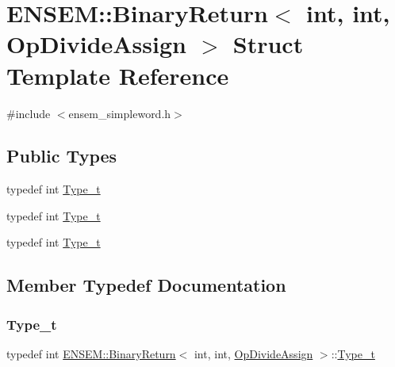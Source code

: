 \hypertarget{structENSEM_1_1BinaryReturn_3_01int_00_01int_00_01OpDivideAssign_01_4}{}\section{E\+N\+S\+EM\+:\+:Binary\+Return$<$ int, int, Op\+Divide\+Assign $>$ Struct Template Reference}
\label{structENSEM_1_1BinaryReturn_3_01int_00_01int_00_01OpDivideAssign_01_4}


{\ttfamily \#include $<$ensem\+\_\+simpleword.\+h$>$}

\subsection*{Public Types}
\begin{DoxyCompactItemize}
\item 
typedef int \mbox{\hyperlink{structENSEM_1_1BinaryReturn_3_01int_00_01int_00_01OpDivideAssign_01_4_a1d70852aadd3281d90240a0c36417d8b}{Type\+\_\+t}}
\item 
typedef int \mbox{\hyperlink{structENSEM_1_1BinaryReturn_3_01int_00_01int_00_01OpDivideAssign_01_4_a1d70852aadd3281d90240a0c36417d8b}{Type\+\_\+t}}
\item 
typedef int \mbox{\hyperlink{structENSEM_1_1BinaryReturn_3_01int_00_01int_00_01OpDivideAssign_01_4_a1d70852aadd3281d90240a0c36417d8b}{Type\+\_\+t}}
\end{DoxyCompactItemize}


\subsection{Member Typedef Documentation}
\mbox{\label{structENSEM_1_1BinaryReturn_3_01int_00_01int_00_01OpDivideAssign_01_4_a1d70852aadd3281d90240a0c36417d8b}} 
\subsubsection{\texorpdfstring{Type\_t}{Type\_t}\hspace{0.1cm}{\footnotesize\ttfamily [1/3]}}
{\footnotesize\ttfamily typedef int \mbox{\hyperlink{structENSEM_1_1BinaryReturn}{E\+N\+S\+E\+M\+::\+Binary\+Return}}$<$ int, int, \mbox{\hyperlink{structENSEM_1_1OpDivideAssign}{Op\+Divide\+Assign}} $>$\+::\mbox{\hyperlink{structENSEM_1_1BinaryReturn_3_01int_00_01int_00_01OpDivideAssign_01_4_a1d70852aadd3281d90240a0c36417d8b}{Type\+\_\+t}}}

